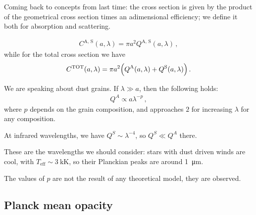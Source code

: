 \documentclass[main.tex]{subfiles}
\begin{document}

Coming back to concepts from last time: the cross section is given by the product of the geometrical cross section times an adimensional efficiency; we define it both for absorption and scattering. 

\begin{align}
  C^{\text{A, S}} (a, \lambda )
  = \pi a^2 Q^{\text{A, S}} (a, \lambda )
\,,
\end{align}
%
while for the total cross section we have 
%
\begin{align}
  C^{\text{TOT}} (a, \lambda )
  = \pi a^2 \qty(Q^{\text{A}}(a, \lambda ) + Q^{\text{S}}(a, \lambda ))
\,.
\end{align}

We are speaking about dust grains. 
If \(\lambda \gg a\), then the following holds: 
%
\begin{align}
  Q^{A} \propto a \lambda^{-p}   
\,,
\end{align}
%
where \(p\) depends on the grain composition, and approaches \(2\) for increasing \(\lambda \) for any composition.

At infrared wavelengths, we have \(Q^{S} \sim \lambda^{-4}\), so \(Q^{S}\ll Q^{A}\) there. 

These are the wavelengths we should consider: stars with dust driven winds are cool, with \(T _{\text{eff}} \sim \SI{3}{\kilo\kelvin}\), so their Planckian peaks are around \SI{1}{\micro m}.


The values of \(p\) are not the result of any theoretical model, they are observed. 


\subsection{Planck mean opacity}
\end{document}
